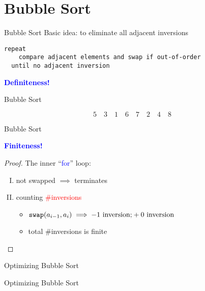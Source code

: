 \section{Bubble Sort}

\begin{frame}[fragile]{Bubble Sort}
  Basic idea: to eliminate all adjacent inversions
  \begin{lstlisting}[style = code]
  repeat
    compare adjacent elements and swap if out-of-order
  until no adjacent inversion
  \end{lstlisting}

  \pause

  \begin{center}
	\textcolor{blue}{\bf Definiteness!}
  \end{center}
 
  
\end{frame}
\begin{frame}{Bubble Sort}
  

  \[
	5\quad 3\quad 1\quad 6\quad 7\quad 2\quad 4\quad 8
  \]
\end{frame}
\begin{frame}{Bubble Sort}
  

  \begin{center}
	\textcolor{blue}{\bf Finiteness!}
  \end{center}

  \begin{proof}
	The inner ``\textcolor{blue}{for}'' loop:
	\begin{enumerate}[I.]
	  \item not swapped $\implies$ terminates
	  \item counting \textcolor{red}{\#inversions}
		\begin{itemize}
		  \item $\text{\texttt{swap}}(a_{i-1}, a_{i}) \implies -1 \text{ inversion;} +0 \text{ inversion}$
		  \item total \#inversions is finite
		\end{itemize}
	\end{enumerate}
  \end{proof}
\end{frame}
\begin{frame}{Optimizing Bubble Sort}
  
\end{frame}
\begin{frame}{Optimizing Bubble Sort}
  
\end{frame}
